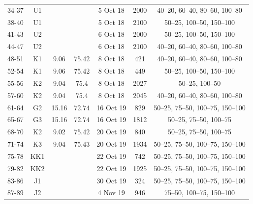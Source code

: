 \documentclass[authoryear,review,12pt]{elsarticle}
\begin{document}
\begin{table}[htbp]
{\begin{adjustwidth}{0in}{-2in}
\begin{tabular}{ccccccc}
				34-37       & U1  &            &            & 5 Oct 18                  & 2000       & 40–20, 60–40, 80–60, 100–80   \\
				38-40       & U1  &            &            & 5 Oct 18                  & 2100       & 50–25, 100–50, 150–100        \\
				41-43       & U2  &            &            & 6 Oct 18                  & 2000       & 50–25, 100–50, 150–100        \\
				44-47       & U2  &            &            & 6 Oct 18                  & 2100       & 40–20, 60–40, 80–60, 100–80   \\
				48-51       & K1  & 9.06       & 75.42      & 8 Oct 18                  & 421        & 40–20, 60–40, 80–60, 100–80   \\
				52-54       & K1  & 9.06       & 75.42      & 8 Oct 18                  & 449        & 50–25, 100–50, 150–100        \\
				55-56       & K2  & 9.04       & 75.4       & 8 Oct 18                  & 2027       & 50–25, 100–50                 \\
				57-60       & K2  & 9.04       & 75.4       & 8 Oct 18                  & 2045       & 40–20, 60–40, 80–60, 100–80   \\
				\midrule
				61-64       & G2  & 15.16      & 72.74      & 16 Oct 19                 & 829        & 50–25, 75–50, 100–75, 150–100 \\
				65-67       & G3  & 15.16      & 72.74      & 16 Oct 19                 & 1812       & 50–25, 75–50, 100–75          \\
				68-70       & K2  & 9.02       & 75.42      & 20 Oct 19                 & 840        & 50–25, 75–50, 100–75          \\
				71-74       & K3  & 9.04       & 75.43      & 20 Oct 19                 & 1934       & 50–25, 75–50, 100–75, 150–100 \\
				75-78       & KK1 &            &            & 22 Oct 19                 & 742        & 50–25, 75–50, 100–75, 150–100 \\
				79-82       & KK2 &            &            & 22 Oct 19                 & 1925       & 50–25, 75–50, 100–75, 150–100 \\
				83-86         & J1  &            &            & 30 Oct 19                 & 324        & 50–25, 75–50, 100–75, 150–100 \\
				87-89         & J2  &            &            & 4 Nov 19                  & 946        & 75–50, 100–75, 150–100        \\

\end{tabular}
\end{adjustwidth}}
\end{table}
\end{document}
